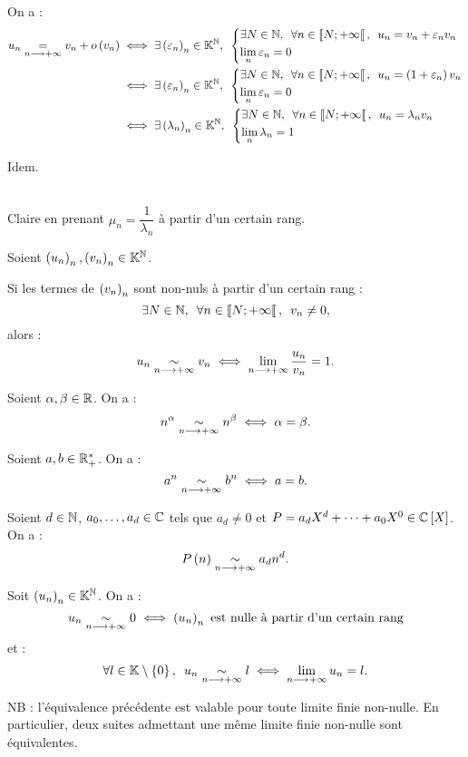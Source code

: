 \begin{dem}[(2) \(\ssi\) (3)]
On a : \[\begin{aligned}
u_n\egqd{n\to\pinf}v_n+\o{v_n}&\ssi\quantifs{\exists\paren{\epsilon_n}_n\in\K^\N}\begin{dcases}
\quantifs{\exists N\in\N;\forall n\in\interventierie{N}{\pinf}}u_n=v_n+\epsilon_nv_n \\
\lim_n\epsilon_n=0
\end{dcases} \\
&\ssi\quantifs{\exists\paren{\epsilon_n}_n\in\K^\N}\begin{dcases}
\quantifs{\exists N\in\N;\forall n\in\interventierie{N}{\pinf}}u_n=\paren{1+\epsilon_n}v_n \\
\lim_n\epsilon_n=0
\end{dcases} \\
&\ssi\quantifs{\exists\paren{\lambda_n}_n\in\K^\N}\begin{dcases}
\quantifs{\exists N\in\N;\forall n\in\interventierie{N}{\pinf}}u_n=\lambda_nv_n \\
\lim_n\lambda_n=1
\end{dcases}
\end{aligned}\]
\end{dem}

\begin{dem}[(1) \(\ssi\) (4)]
Idem.
\end{dem}

\begin{dem}[(3) \(\ssi\) (4)]~\\
Claire en prenant \(\mu_n=\dfrac{1}{\lambda_n}\) à partir d'un certain rang.
\end{dem}

\begin{prop}
Soient \(\left(u_n\right)_n,\left(v_n\right)_n\in\mathbb{K}^{\mathbb{N}}\).

Si les termes de \(\left(v_n\right)_n\) sont non-nuls à partir d'un certain rang : \[\quantifs{\exists N\in\N;\forall n\in\interventierie{N}{\pinf}}v_n\not=0,\] alors : \[u_n\underset{n\longrightarrow+\infty}{\sim}v_n\iff\lim_{n\longrightarrow+\infty}\dfrac{u_n}{v_n}=1.\]
\end{prop}

\begin{ex}
Soient \(\alpha,\beta\in\mathbb{R}\). On a : \[n^\alpha\underset{n\longrightarrow+\infty}{\sim}n^\beta\iff\alpha=\beta.\]

Soient \(a,b\in\mathbb{R}_+^*\). On a : \[a^n\underset{n\longrightarrow+\infty}{\sim}b^n\iff a=b.\]

Soient \(d\in\mathbb{N}\), \(a_0,\dots,a_d\in\mathbb{C}\) tels que \(a_d\not=0\) et \(P=a_dX^d+\dots+a_0X^0\in\poly[\C]\). On a : \[P\left(n\right)\underset{n\longrightarrow+\infty}{\sim}a_dn^d.\]

Soit \(\left(u_n\right)_n\in\mathbb{K}^{\mathbb{N}}\). On a : \[u_n\underset{n\longrightarrow+\infty}{\sim}0\iff\left(u_n\right)_n\text{ est nulle à partir d'un certain rang}\] et : \[\quantifs{\forall l\in\K\excluant\accol{0}}u_n\simqd{n\to\pinf}l\ssi\lim_{n\to\pinf}u_n=l.\]

NB : l'équivalence précédente est valable pour toute limite finie non-nulle. En particulier, deux suites admettant une même limite finie non-nulle sont équivalentes.
\end{ex}

